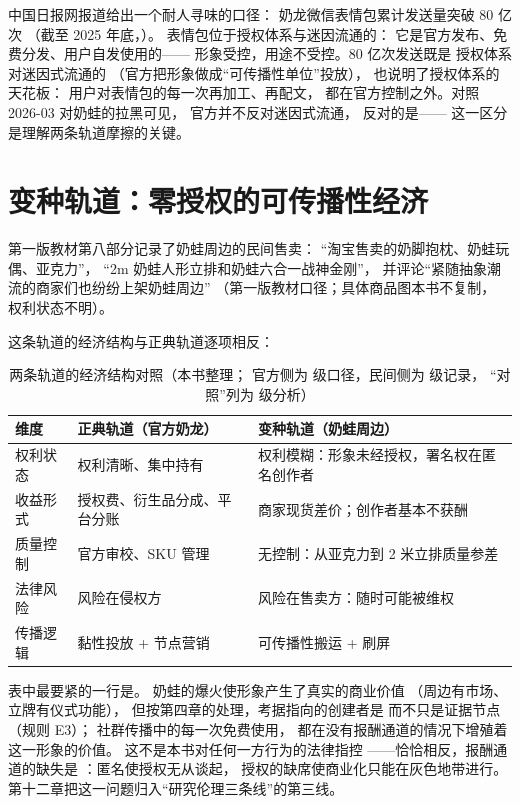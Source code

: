 \begin{nlcase}[案例 9-1：表情包的 80 亿次]
  中国日报网报道给出一个耐人寻味的口径：
  奶龙微信表情包累计发送量突破 80 亿次
  （截至 2025 年底，\cite{chinadaily2026six}）。
  表情包位于授权体系与迷因流通的：
  它是官方发布、免费分发、用户自发使用的——
  形象受控，用途不受控。80 亿次发送既是
  授权体系对迷因式流通的
  （官方把形象做成“可传播性单位”投放），
  也说明了授权体系的天花板：
  用户对表情包的每一次再加工、再配文，
  都在官方控制之外。对照 2026-03 对奶蛙的拉黑可见，
  官方并不反对迷因式流通，
  反对的是——
  这一区分是理解两条轨道摩擦的关键。
\end{nlcase}

\section{变种轨道：零授权的可传播性经济}\label{sec:09:variant}

第一版教材第八部分记录了奶蛙周边的民间售卖：
“淘宝售卖的奶脚抱枕、奶蛙玩偶、亚克力”，
“2m 奶蛙人形立排和奶蛙六合一战神金刚”，
并评论“紧随抽象潮流的商家们也纷纷上架奶蛙周边”
（第一版教材口径；具体商品图本书不复制，
权利状态不明）。

这条轨道的经济结构与正典轨道逐项相反：

\begin{table}[htbp]\centering
  \caption{两条轨道的经济结构对照（本书整理；
          官方侧为  级口径，民间侧为  级记录，
          “对照”列为  级分析）}
  \label{tab:09:two}
  \small
  \begin{tabularx}{\textwidth}{@{}lXX@{}}
    \toprule
    维度 & 正典轨道（官方奶龙） & 变种轨道（奶蛙周边） \\ \midrule
    权利状态 & 权利清晰、集中持有 &
      权利模糊：形象未经授权，署名权在匿名创作者 \\
    收益形式 & 授权费、衍生品分成、平台分账 &
      商家现货差价；创作者基本不获酬 \\
    质量控制 & 官方审校、SKU 管理 &
      无控制：从亚克力到 2 米立排质量参差 \\
    法律风险 & 风险在侵权方 &
      风险在售卖方：随时可能被维权 \\
    传播逻辑 & 黏性投放 + 节点营销 &
      可传播性搬运 + 刷屏 \\ \bottomrule
  \end{tabularx}
\end{table}

表中最要紧的一行是。
奶蛙的爆火使形象产生了真实的商业价值
（周边有市场、立牌有仪式功能），
但按第四章的处理，考据指向的创建者是
而不只是证据节点（规则 E3）；
社群传播中的每一次免费使用，
都在没有报酬通道的情况下增殖着这一形象的价值。
这不是本书对任何一方行为的法律指控
——恰恰相反，报酬通道的缺失是
：匿名使授权无从谈起，
授权的缺席使商业化只能在灰色地带进行。
第十二章把这一问题归入“研究伦理三条线”的第三线。

